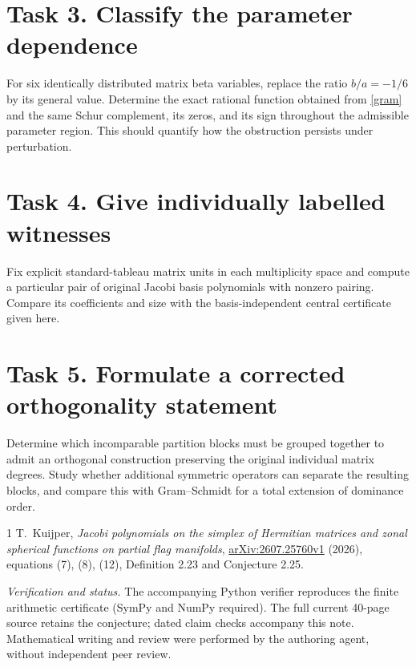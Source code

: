 \documentclass[11pt]{article}
\begin{document}
\section*{Task 3. Classify the parameter dependence}
For six identically distributed matrix beta variables, replace the
ratio $b/a=-1/6$ by its general value. Determine the exact rational
function obtained from \eqref{gram} and the same Schur complement,
its zeros, and its sign throughout the admissible parameter region.
This should quantify how the obstruction persists under perturbation.

\section*{Task 4. Give individually labelled witnesses}
Fix explicit standard-tableau matrix units in each multiplicity space
and compute a particular pair of original Jacobi basis polynomials
with nonzero pairing. Compare its coefficients and size with the
basis-independent central certificate given here.

\section*{Task 5. Formulate a corrected orthogonality statement}
Determine which incomparable partition blocks must be grouped
together to admit an orthogonal construction preserving the original
individual matrix degrees. Study whether additional symmetric
operators can separate the resulting blocks, and compare this with
Gram--Schmidt for a total extension of dominance order.

\begin{thebibliography}{1}
 T.~Kuijper,
\emph{Jacobi polynomials on the simplex of Hermitian matrices and
zonal spherical functions on partial flag manifolds},
\href{https://arxiv.org/abs/2607.25760v1}{arXiv:2607.25760v1} (2026),
equations (7), (8), (12), Definition 2.23 and Conjecture 2.25.
\end{thebibliography}
\noindent\textit{Verification and status.}
The accompanying Python verifier reproduces the finite arithmetic
certificate (SymPy and NumPy required).
The full current 40-page source retains the conjecture; dated claim
checks accompany this note. Mathematical writing and review were
performed by the authoring agent, without independent peer review.
\end{document}

